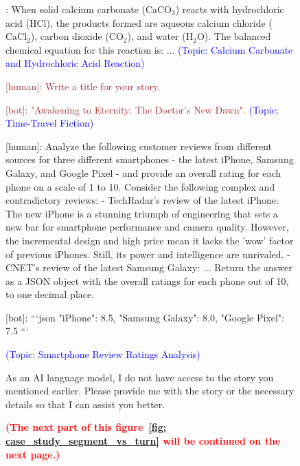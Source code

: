 \begin{figure}[htb]
\begin{tcolorbox}[left=3pt,right=3pt,top=3pt,bottom=3pt,title=\textbf{Retrieved Memory (Turn-Level):}]
[bot]: When solid calcium carbonate ($\text{CaCO}_{3}$) reacts with hydrochloric acid (HCl), the products formed are aqueous calcium chloride ($\text{CaCl}_{2}$), carbon dioxide ($\text{CO}_{2}$), and water ($\text{H}_{2}\text{O}$). The balanced chemical equation for this reaction is: ... \textcolor{blue}{(Topic: Calcium Carbonate and Hydrochloric Acid Reaction)}

\textcolor{brown}{
[human]: Write a title for your story.}

\textcolor{brown}{
[bot]: "Awakening to Eternity: The Doctor's New Dawn".
} \textcolor{blue}{(Topic: Time-Travel Fiction)}

[human]: Analyze the following customer reviews from different sources for three different smartphones - the latest iPhone, Samsung Galaxy, and Google Pixel - and provide an overall rating for each phone on a scale of 1 to 10. Consider the following complex and contradictory reviews: - TechRadar's review of the latest iPhone: The new iPhone is a stunning triumph of engineering that sets a new bar for smartphone performance and camera quality. However, the incremental design and high price mean it lacks the 'wow' factor of previous iPhones. Still, its power and intelligence are unrivaled. - CNET's review of the latest Samsung Galaxy: ... Return the answer as a JSON object with the overall ratings for each phone out of 10, to one decimal place.

[bot]: ```json { "iPhone": 8.5, "Samsung Galaxy": 8.0, "Google Pixel": 7.5 } ```

\textcolor{blue}{(Topic: Smartphone Review Ratings Analysis)}
\end{tcolorbox}
\begin{tcolorbox}[left=3pt,right=3pt,top=3pt,bottom=3pt,title=\textbf{Answer (Turn-Level Retrieval):}]
As an AI language model, I do not have access to the story you mentioned earlier. Please provide me with the story or the necessary details so that I can assist you better.

\textbf{\textcolor{red}{(The next part of this figure~\ref{fig: case_study_segment_vs_turn} will be continued on the next page.)}}
\end{tcolorbox}
\end{figure}

